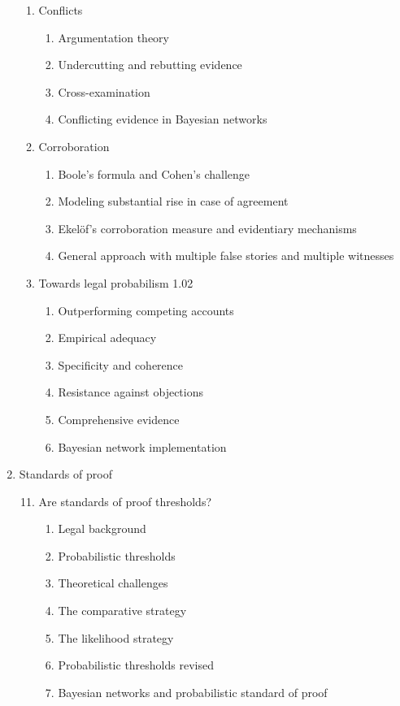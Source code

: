 \documentclass[
  10pt,
  dvipsnames,enabledeprecatedfontcommands]{scrartcl}
\begin{document}
\begin{enumerate}
\begin{enumerate}
  
  \item Conflicts
  \begin{enumerate}
  \item Argumentation theory
  \item Undercutting and rebutting evidence
  \item Cross-examination
  \item Conflicting evidence in Bayesian networks
  \end{enumerate}
 
 
  \item Corroboration
  \begin{enumerate}
  \item Boole's formula and Cohen's challenge
  \item  Modeling substantial rise in case of agreement
  \item Ekel\"of's corroboration measure and evidentiary mechanisms
  \item General approach with multiple false stories and multiple witnesses
  \end{enumerate}


  \item  Towards legal probabilism 1.02
    \begin{enumerate}
    \item Outperforming competing accounts
    \item Empirical adequacy
    \item Specificity and coherence
    \item Resistance against objections 
    \item Comprehensive evidence
    \item Bayesian network implementation
    \end{enumerate}


\end{enumerate}
\item  Standards of proof
\begin{enumerate}


\setcounter{enumii}{10}
 \item  Are standards of proof thresholds?
  \begin{enumerate}
  \item  Legal background
  \item  Probabilistic thresholds
  \item  Theoretical challenges
  \item  The comparative strategy
  \item  The likelihood strategy
  \item  Probabilistic thresholds revised
  \item  Bayesian networks and probabilistic standard of proof
  \end{enumerate}



\end{enumerate}
\end{enumerate}
\end{document}
